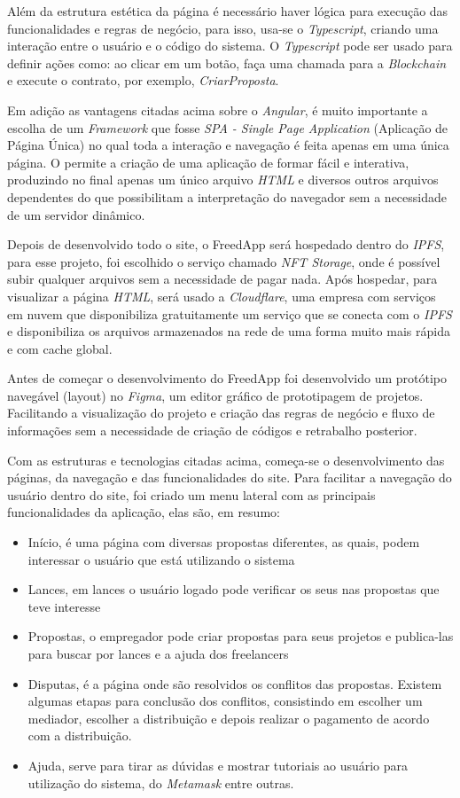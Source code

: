 Além da estrutura estética da página é necessário haver lógica para execução das funcionalidades e regras de negócio, para isso, usa-se o \textit{Typescript}, criando uma interação entre o usuário e o código do sistema. O \textit{Typescript} pode ser usado para definir ações como: ao clicar em um botão, faça uma chamada para a \textit{Blockchain} e execute o contrato, por exemplo, \textit{CriarProposta}.

Em adição as vantagens citadas acima sobre o \textit{Angular}, é muito importante a escolha de um \textit{Framework} que fosse \textit{SPA - Single Page Application} (Aplicação de Página Única) no qual toda a interação e navegação é feita apenas em uma única página. O  permite a criação de uma aplicação de formar fácil e interativa, produzindo no final apenas um único arquivo \textit{HTML} e diversos outros arquivos dependentes do  que possibilitam a interpretação do navegador sem a necessidade de um servidor dinâmico.

Depois de desenvolvido todo o site, o FreedApp será hospedado dentro do \textit{IPFS}, para esse projeto, foi escolhido o serviço chamado \textit{NFT Storage}, onde é possível subir qualquer arquivos sem a necessidade de pagar nada. Após hospedar, para visualizar a página \textit{HTML}, será usado a \textit{Cloudflare}, uma empresa com serviços em nuvem que disponibiliza gratuitamente um serviço que se conecta com o \textit{IPFS} e disponibiliza os arquivos armazenados na rede de uma forma muito mais rápida e com cache global.

Antes de começar o desenvolvimento do FreedApp foi desenvolvido um protótipo navegável (layout) no \textit{Figma}, um editor gráfico de prototipagem de projetos. Facilitando a visualização do projeto e criação das regras de negócio e fluxo de informações sem a necessidade de criação de códigos e retrabalho posterior.

Com as estruturas e tecnologias citadas acima, começa-se o desenvolvimento das páginas, da navegação e das funcionalidades do site. Para facilitar a navegação do usuário dentro do site, foi criado um menu lateral com as principais funcionalidades da aplicação, elas são, em resumo: 

\begin{itemize}
\item Início, é uma página com diversas propostas diferentes, as quais, podem interessar o usuário que está utilizando o sistema
\item Lances, em lances o usuário logado pode verificar os seus nas propostas que teve interesse
\item Propostas, o empregador pode criar propostas para seus projetos e publica-las para buscar por lances e a ajuda dos freelancers
\item Disputas, é a página onde são resolvidos os conflitos das propostas. Existem algumas etapas para conclusão dos conflitos, consistindo em escolher um mediador, escolher a distribuição e depois realizar o pagamento de acordo com a distribuição.
\item Ajuda, serve para tirar as dúvidas e mostrar tutoriais ao usuário para utilização do sistema, do \textit{Metamask} entre outras.
\end{itemize}

